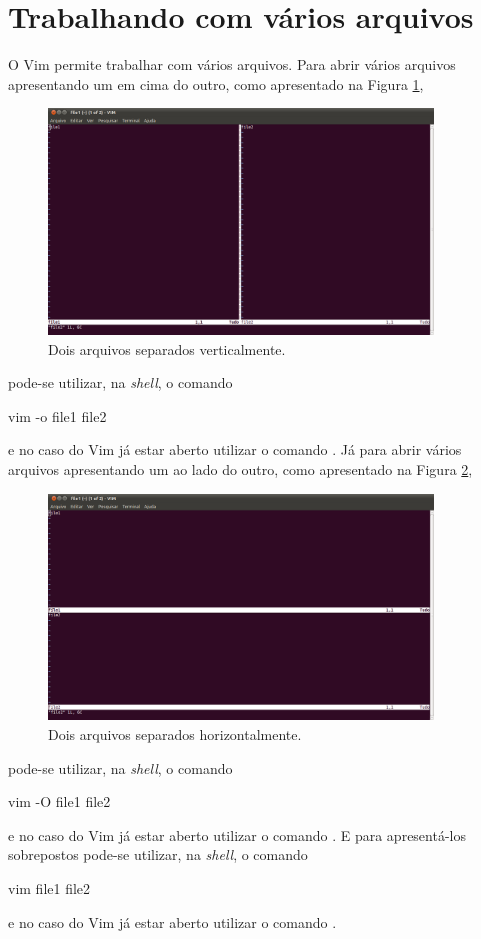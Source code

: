\section{Trabalhando com vários arquivos}
O Vim permite trabalhar com vários arquivos. Para abrir vários arquivos apresentando um em cima do outro, como apresentado na Figura \ref{fig:vim_vsplit_screen},
\begin{figure}[h!]
    \centering
    \includegraphics[height=6cm]{figures/vim_vsplit_screen}
    \caption{Dois arquivos separados verticalmente.}
    \label{fig:vim_vsplit_screen}
\end{figure}
pode-se utilizar, na \textit{shell}, o comando
\begin{code}
    vim -o file1 file2
\end{code}
e no caso do Vim já estar aberto utilizar o comando  .
Já para abrir vários arquivos apresentando um ao lado do outro, como apresentado na Figura \ref{fig:vim_split_screen},
\begin{figure}[h!]
    \centering
    \includegraphics[height=6cm]{figures/vim_split_screen}
    \caption{Dois arquivos separados horizontalmente.}
    \label{fig:vim_split_screen}
\end{figure}
pode-se utilizar, na \textit{shell}, o comando
\begin{code}
    vim -O file1 file2
\end{code}
e no caso do Vim já estar aberto utilizar o comando  .
E para apresentá-los sobrepostos pode-se utilizar, na \textit{shell}, o comando
\begin{code}
    vim file1 file2
\end{code}
e no caso do Vim já estar aberto utilizar o comando  .

